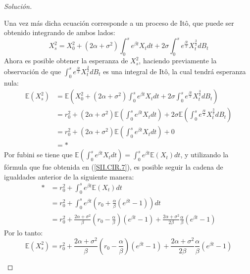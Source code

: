 \documentclass[11pt,notitlepage]{article}
\newenvironment{solucion}
  {\begin{proof}[Solución]}
  {\end{proof}}
\begin{document}
\begin{solucion}
\begin{itemize}
\begin{equation*}
           \end{equation*}
           Una vez más dicha ecuación corresponde a un proceso de Itô, que puede ser obtenido integrando de ambos lados:
           \begin{equation*}
               X_{s}^2 = X_{0}^2 + (2\alpha + \sigma^2 )\int_{0}^{s}e^{\beta t}X_tdt +  2\sigma\int_{0}^{s}e^{\frac{\beta t}{2}}X_{t}^{\frac{3}{2}}dB_t 
           \end{equation*}
           Ahora es posible obtener la esperanza de \(X_{s}^2\), haciendo previamente la observación de que \(\int_{0}^{s}e^{\frac{\beta t}{2}}X_{t}^{\frac{3}{2}}dB_t \)
           es una integral de Itô, la cual tendrá esperanza nula: 
           \begin{align*}
               \mathbb{E}(X_{s}^2) &= \mathbb{E}\left( X_{0}^2 + (2\alpha + \sigma^2 )\int_{0}^{s}e^{\beta t}X_tdt +  2\sigma\int_{0}^{s}e^{\frac{\beta t}{2}}X_{t}^{\frac{3}{2}}dB_t  \right) \\
                                   &= r_{0}^2 + (2\alpha + \sigma^2 )\mathbb{E}\left(\int_{0}^{s}e^{\beta t}X_tdt\right) + 2\sigma\mathbb{E}\left(\int_{0}^{s}e^{\frac{\beta t}{2}}X_{t}^{\frac{3}{2}}dB_t\right)\\      
                                   &=r_{0}^2 + (2\alpha + \sigma^2 )\mathbb{E}\left(\int_{0}^{s}e^{\beta t}X_tdt\right) + 0\\
                                   &= *
           \end{align*}
           Por fubini se tiene que \(\mathbb{E}\left(\int_{0}^{s}e^{\beta t}X_tdt\right) = \int_{0}^{s}e^{\beta t}\mathbb{E}(X_t)dt\), y utilizando la fórmula que 
           fue obtenida en (\ref{SII.CIR.7}), es posible seguir la cadena de igualdades anterior de la siguiente manera: 
           \begin{align*}
               * &= r_{0}^2 + \int_{0}^{s}e^{\beta t}\mathbb{E}(X_t)dt\\
                 &= r_{0}^2 + \int_{0}^{s}e^{\beta t}\left(r_0 +\frac{\alpha}{\beta}\left(e^{\beta t} - 1 \right) \right)dt\\
                 &= r_{0}^2 + \frac{2\alpha + \sigma^2}{\beta}\left(r_0 - \frac{\alpha}{\beta}\right)\left(e^{\beta t} -1\right) +
           \frac{2\alpha + \sigma^2}{2\beta}\frac{\alpha}{\beta}\left(e^{\beta t} -1\right)
           \end{align*}
           Por lo tanto: 
           \begin{equation}\label{SII.CIR.8}
              \mathbb{E}(X_{s}^2) = r_{0}^2 + \frac{2\alpha + \sigma^2}{\beta}\left(r_0 - \frac{\alpha}{\beta}\right)\left(e^{\beta t} -1\right) +
           \frac{2\alpha + \sigma^2}{2\beta}\frac{\alpha}{\beta}\left(e^{\beta t} -1\right)
           \end{equation}
        

\end{itemize}
\end{solucion}
\end{document}
